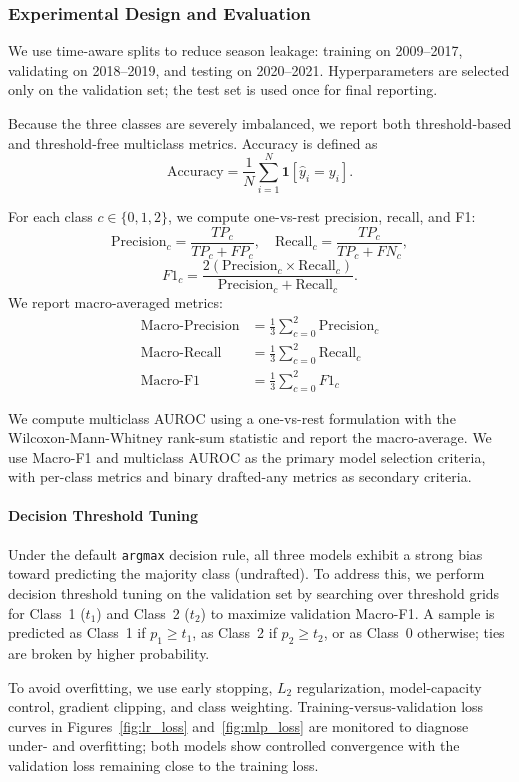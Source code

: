 \subsubsection{Experimental Design and Evaluation}

We use time-aware splits to reduce season leakage: training on 2009--2017, validating on 2018--2019, and testing on 2020--2021. Hyperparameters are selected only on the validation set; the test set is used once for final reporting.

Because the three classes are severely imbalanced, we report both threshold-based and threshold-free multiclass metrics. Accuracy is defined as
\[
\text{Accuracy} = \frac{1}{N}\sum_{i=1}^{N}\mathbf{1}[\hat{y}_i = y_i].
\]

For each class $c \in \{0,1,2\}$, we compute one-vs-rest precision, recall, and F1:
\[
\text{Precision}_c = \frac{TP_c}{TP_c + FP_c}, \quad
\text{Recall}_c = \frac{TP_c}{TP_c + FN_c},
\]
\[
F1_c = \frac{2(\text{Precision}_c \times \text{Recall}_c)}{\text{Precision}_c + \text{Recall}_c}.
\]
We report macro-averaged metrics:
\begin{align*}
\text{Macro-Precision} &= \frac{1}{3}\sum_{c=0}^{2}\text{Precision}_c \\
\text{Macro-Recall} &= \frac{1}{3}\sum_{c=0}^{2}\text{Recall}_c \\
\text{Macro-F1} &= \frac{1}{3}\sum_{c=0}^{2}F1_c
\end{align*}

We compute multiclass AUROC using a one-vs-rest formulation with the Wilcoxon-Mann-Whitney rank-sum statistic and report the macro-average. We use Macro-F1 and multiclass AUROC as the primary model selection criteria, with per-class metrics and binary drafted-any metrics as secondary criteria.

\paragraph{Decision Threshold Tuning}
Under the default \texttt{argmax} decision rule, all three models exhibit a strong bias toward predicting the majority class (undrafted). To address this, we perform decision threshold tuning on the validation set by searching over threshold grids for Class~1 ($t_1$) and Class~2 ($t_2$) to maximize validation Macro-F1. A sample is predicted as Class~1 if $p_1 \geq t_1$, as Class~2 if $p_2 \geq t_2$, or as Class~0 otherwise; ties are broken by higher probability.

To avoid overfitting, we use early stopping, $L_2$ regularization, model-capacity control, gradient clipping, and class weighting. Training-versus-validation loss curves in Figures~\ref{fig:lr_loss} and~\ref{fig:mlp_loss} are monitored to diagnose under- and overfitting; both models show controlled convergence with the validation loss remaining close to the training loss.


